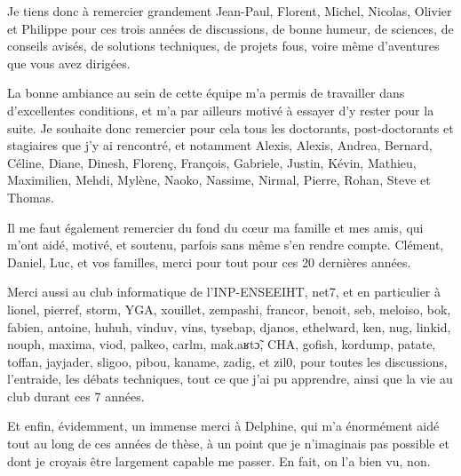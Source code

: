 Je tiens donc à remercier grandement Jean-Paul, Florent, Michel, Nicolas, Olivier et Philippe pour ces trois années
de discussions, de bonne humeur, de sciences, de conseils avisés, de solutions techniques, de projets fous, voire même
d'aventures que vous avez dirigées.

La bonne ambiance au sein de cette équipe m'a permis de travailler dans d'excellentes conditions, et m'a par ailleurs
motivé à essayer d'y rester pour la suite. Je souhaite donc remercier pour cela tous les doctorants, post-doctorants
et stagiaires que j'y ai rencontré, et notamment Alexis, Alexis, Andrea, Bernard, Céline, Diane, Dinesh, Florenç,
François, Gabriele, Justin, Kévin, Mathieu, Maximilien, Mehdi, Mylène, Naoko, Nassime, Nirmal, Pierre, Rohan, Steve et
Thomas.

Il me faut également remercier du fond du cœur ma famille et mes amis, qui m'ont aidé, motivé, et soutenu, parfois sans
même s'en rendre compte. Clément, Daniel, Luc, et vos familles, merci pour tout pour ces 20 dernières années.

Merci aussi au club informatique de l'INP-ENSEEIHT, net7, et en particulier à lionel, pierref, storm, YGA, xouillet,
zempashi, francor, benoit, seb, meloiso, bok, fabien, antoine, huhuh, vinduv, vins, tysebap, djanos, ethelward, ken,
nug, linkid, nouph, maxima, viod, palkeo, carlm, mak.aʁtɔ̃, CHA, gofish, kordump, patate, toffan, jayjader, sligoo,
pibou, kaname, zadig, et zil0, pour toutes les discussions, l'entraide, les débats techniques, tout ce que j'ai pu
apprendre, ainsi que la vie au club durant ces 7 années.

Et enfin, évidemment, un immense merci à Delphine, qui m'a énormément aidé tout au long de ces années de thèse, à un
point que je n'imaginais pas possible et dont je croyais être largement capable me passer. En fait, on l'a bien vu,
non.
